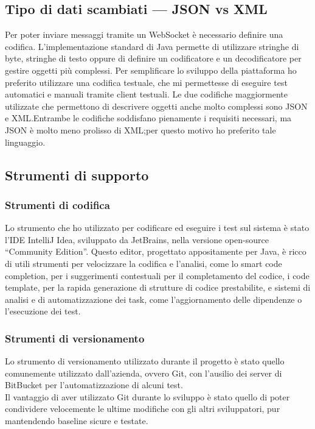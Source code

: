 	\subsection{Tipo di dati scambiati --- JSON vs XML}
	Per poter inviare messaggi tramite un WebSocket è necessario definire una codifica. L'implementazione standard di Java permette di utilizzare stringhe di byte, stringhe di testo oppure di definire un codificatore e un decodificatore per gestire oggetti più complessi. Per semplificare lo sviluppo della piattaforma ho preferito utilizzare una codifica testuale, che mi permettesse di eseguire test automatici e manuali tramite client testuali. Le due codifiche maggiormente utilizzate che permettono di descrivere oggetti anche molto complessi sono JSON e XML.\@ Entrambe le codifiche soddisfano pienamente i requisiti necessari, ma JSON è molto meno prolisso di XML;\@ per questo motivo ho preferito tale linguaggio.

	\subsection{Strumenti di supporto}
		\subsubsection{Strumenti di codifica}
		Lo strumento che ho utilizzato per codificare ed eseguire i test sul sistema è stato l'IDE IntelliJ Idea, sviluppato da JetBrains, nella versione open-source ``Community Edition''. Questo editor, progettato appositamente per Java, è ricco di utili strumenti per velocizzare la codifica e l'analisi, come lo smart code completion, per i suggerimenti contestuali per il completamento del codice, i code template, per la rapida generazione di strutture di codice prestabilite, e sistemi di analisi e di automatizzazione dei task, come l'aggiornamento delle dipendenze o l'esecuzione dei test.

		\subsubsection{Strumenti di versionamento}
		Lo strumento di versionamento utilizzato durante il progetto è stato quello comunemente utilizzato dall'azienda, ovvero Git, con l'ausilio dei server di BitBucket per l'automatizzazione di alcuni test.
		\\
		Il vantaggio di aver utilizzato Git durante lo sviluppo è stato quello di poter condividere velocemente le ultime modifiche con gli altri sviluppatori, pur mantendendo baseline sicure e testate.
		
